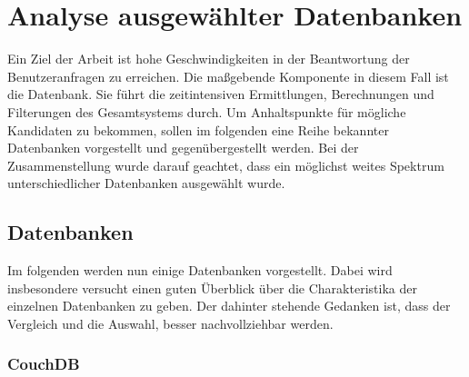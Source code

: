 \chapter{Analyse ausgewählter Datenbanken}
\label{ch:AnalyseDatenbanken}

Ein Ziel der Arbeit ist hohe Geschwindigkeiten in der Beantwortung der Benutzeranfragen zu erreichen. Die maßgebende Komponente in diesem Fall ist die Datenbank. Sie führt die zeitintensiven Ermittlungen, Berechnungen und Filterungen des Gesamtsystems durch. Um Anhaltspunkte für mögliche Kandidaten zu bekommen, sollen im folgenden eine Reihe bekannter Datenbanken vorgestellt und gegenübergestellt werden. Bei der Zusammenstellung wurde darauf geachtet, dass ein möglichst weites Spektrum unterschiedlicher Datenbanken ausgewählt wurde.

\section{Datenbanken}
\label{ch:AnalyseDatenbanken:sec:Datenbanken}

Im folgenden werden nun einige Datenbanken vorgestellt. Dabei wird insbesondere versucht einen guten Überblick über die Charakteristika der einzelnen Datenbanken zu geben. Der dahinter stehende Gedanken ist, dass der Vergleich und die Auswahl, besser nachvollziehbar werden. 

\subsection{CouchDB}
\label{ch:AnalyseDatenbanken:sec:Datenbanken:subsec:CouchDB}

